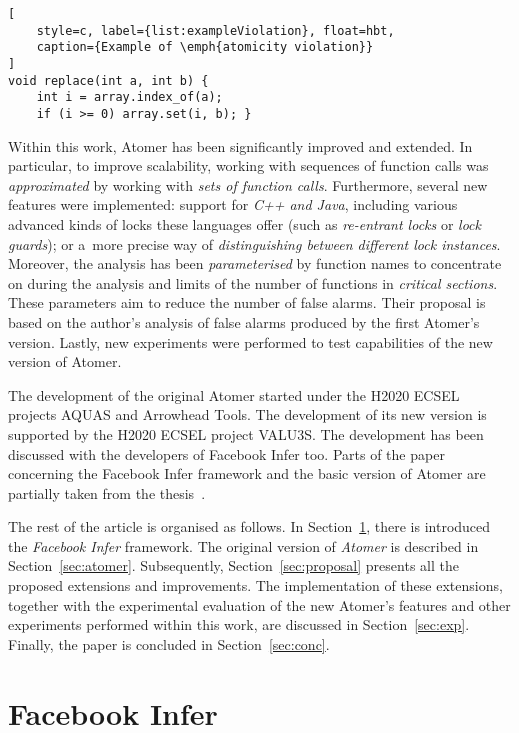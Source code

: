 \documentclass{ExcelAtFIT}
\theoremstyle{example}
\begin{document}
\begin{lstlisting}[
    style=c, label={list:exampleViolation}, float=hbt,
    caption={Example of \emph{atomicity violation}}
]
void replace(int a, int b) {
    int i = array.index_of(a);
    if (i >= 0) array.set(i, b); }
\end{lstlisting}

Within this work, Atomer has been significantly improved and extended. In particular, to improve scalability, working with sequences of function calls was \emph{approximated} by working with \emph{sets of function calls}. Furthermore, several new features were implemented: support for \emph{C++ and Java}, including various advanced kinds of locks these languages offer (such as \emph{re-entrant locks} or \emph{lock guards}); or a~more precise way of \emph{distinguishing between different lock instances}. Moreover, the analysis has been \emph{parameterised} by function names to concentrate on during the analysis and limits of the number of functions in \emph{critical sections}. These parameters aim to reduce the number of false alarms. Their proposal is based on the author's analysis of false alarms produced by the first Atomer's version. Lastly, new experiments were performed to test capabilities of the new version of Atomer.

The development of the original Atomer started under the H2020 ECSEL projects AQUAS and Arrowhead Tools. The development of its new version is supported by the H2020 ECSEL project VALU3S. The development has been discussed with the developers of Facebook Infer too. Parts of the paper concerning the Facebook Infer framework and the basic version of Atomer are partially taken from the thesis~\cite{harmimBP}.

The rest of the article is organised as follows. In Section~\ref{sec:infer}, there is introduced the \emph{Facebook Infer} framework. The original version of \emph{Atomer} is described in Section~\ref{sec:atomer}. Subsequently, Section~\ref{sec:proposal} presents all the proposed extensions and improvements. The implementation of these extensions, together with the experimental evaluation of the new Atomer's features and other experiments performed within this work, are discussed in Section~\ref{sec:exp}. Finally, the paper is concluded in Section~\ref{sec:conc}.


\section{Facebook Infer}
\label{sec:infer}
\end{document}
